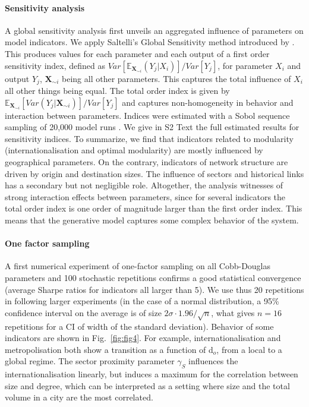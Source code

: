 \documentclass[10pt,letterpaper]{article}
\begin{document}
\paragraph{Sensitivity analysis}

A global sensitivity analysis first unveils an aggregated influence of parameters on model indicators. We apply Saltelli's Global Sensitivity method introduced by \cite{saltelli2008global}. This produces values for each parameter and each output of a first order sensitivity index, defined as $Var\left[\mathbb{E}_{\mathbf{X}_{\sim i}}\left(Y_j | X_i\right)\right] / Var\left[Y_j\right]$, for parameter $X_i$ and output $Y_j$, $\mathbf{X}_{\sim i}$ being all other parameters. This captures the total influence of $X_i$ all other things being equal. The total order index is given by $\mathbb{E}_{\mathbf{X}_{\sim i}} \left[Var(Y_j | \mathbf{X}_{\sim i})\right] / Var\left[Y_j\right]$ and captures non-homogeneity in behavior and interaction between parameters. Indices were estimated with a Sobol sequence sampling of 20,000 model runs \cite{saltelli2010variance}. We give in S2 Text the full estimated results for sensitivity indices. To summarize, we find that indicators related to modularity (internationalisation and optimal modularity) are mostly influenced by geographical parameters. On the contrary, indicators of network structure are driven by origin and destination sizes. The influence of sectors and historical links has a secondary but not negligible role. Altogether, the analysis witnesses of strong interaction effects between parameters, since for several indicators the total order index is one order of magnitude larger than the first order index. This means that the generative model captures some complex behavior of the system.



\paragraph{One factor sampling}

A first numerical experiment of one-factor sampling on all Cobb-Douglas parameters and 100 stochastic repetitions confirms a good statistical convergence (average Sharpe ratios for indicators all larger than 5). We use thus 20 repetitions in following larger experiments (in the case of a normal distribution, a 95\% confidence interval on the average is of size $2\sigma \cdot 1.96 / \sqrt{n}$, what gives $n=16$ repetitions for a CI of width of the standard deviation). Behavior of some indicators are shown in Fig.~\ref{fig:fig4}. For example, internationalisation and metropolisation both show a transition as a function of d$_o$, from a local to a global regime. The sector proximity parameter $\gamma_S$ influences the internationalisation linearly, but induces a maximum for the correlation between size and degree, which can be interpreted as a setting where size and the total volume in a city are the most correlated.
\end{document}
